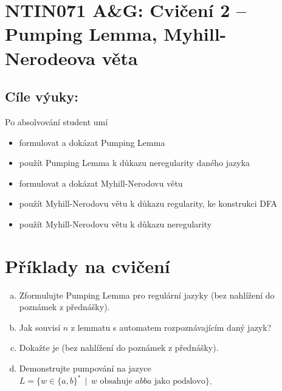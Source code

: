 \documentclass[a4paper,12pt]{amsart}
\begin{document}
\thispagestyle{empty}

\section*{NTIN071 A\&G: Cvičení 2 -- Pumping Lemma, Myhill-Nerodeova věta}

\subsection*{Cíle výuky:} Po absolvování student umí

\begin{itemize}\setlength{\itemsep}{0pt}
    \item formulovat a dokázat Pumping Lemma
    \item použít Pumping Lemma k důkazu neregularity daného jazyka
    \item formulovat a dokázat Myhill-Nerodovu větu
    \item použít Myhill-Nerodovu větu k důkazu regularity, ke konstrukci DFA
    \item použít Myhill-Nerodovu větu k důkazu neregularity
\end{itemize}


\section*{Příklady na cvičení}


\medskip\begin{problem}

    \begin{enumerate}[(a)]\setlength\itemsep{6pt}
        \item Zformulujte Pumping Lemma pro regulární jazyky (bez nahlížení do poznámek z přednášky).
        \item Jak souvisí $n$ z lemmatu s automatem rozpoznávajícím daný jazyk?
        \item Dokažte je (bez nahlížení do poznámek z přednášky).
        \item Demonstrujte pumpování na jazyce $L=\{w\in\{a,b\}^* \,\mid\,\text{$w$ obsahuje $abba$ jako podslovo}\}$.
    \end{enumerate}

\end{problem}
\end{document}
